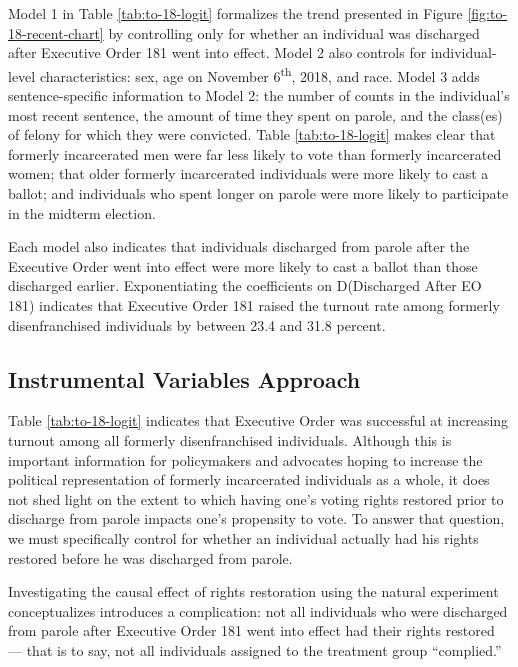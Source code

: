 \documentclass[]{article}
\begin{document}
Model 1 in Table \ref{tab:to-18-logit} formalizes the trend presented in Figure \ref{fig:to-18-recent-chart} by controlling only for whether an individual was discharged after Executive Order 181 went into effect. Model 2 also controls for individual-level characteristics: sex, age on November 6\textsuperscript{th}, 2018, and race. Model 3 adds sentence-specific information to Model 2: the number of counts in the individual's most recent sentence, the amount of time they spent on parole, and the class(es) of felony for which they were convicted. Table \ref{tab:to-18-logit} makes clear that formerly incarcerated men were far less likely to vote than formerly incarcerated women; that older formerly incarcerated individuals were more likely to cast a ballot; and individuals who spent longer on parole were more likely to participate in the midterm election.

Each model also indicates that individuals discharged from parole after the Executive Order went into effect were more likely to cast a ballot than those discharged earlier. Exponentiating the coefficients on D(Discharged After EO 181) indicates that Executive Order 181 raised the turnout rate among formerly disenfranchised individuals by between 23.4 and 31.8 percent.

\hypertarget{instrumental-variables-approach}{%
\subsection*{Instrumental Variables Approach}\label{instrumental-variables-approach}}

Table \ref{tab:to-18-logit} indicates that Executive Order was successful at increasing turnout among all formerly disenfranchised individuals. Although this is important information for policymakers and advocates hoping to increase the political representation of formerly incarcerated individuals as a whole, it does not shed light on the extent to which having one's voting rights restored prior to discharge from parole impacts one's propensity to vote. To answer that question, we must specifically control for whether an individual actually had his rights restored before he was discharged from parole.

Investigating the causal effect of rights restoration using the natural experiment conceptualizes introduces a complication: not all individuals who were discharged from parole after Executive Order 181 went into effect had their rights restored --- that is to say, not all individuals assigned to the treatment group ``complied.''
\end{document}
